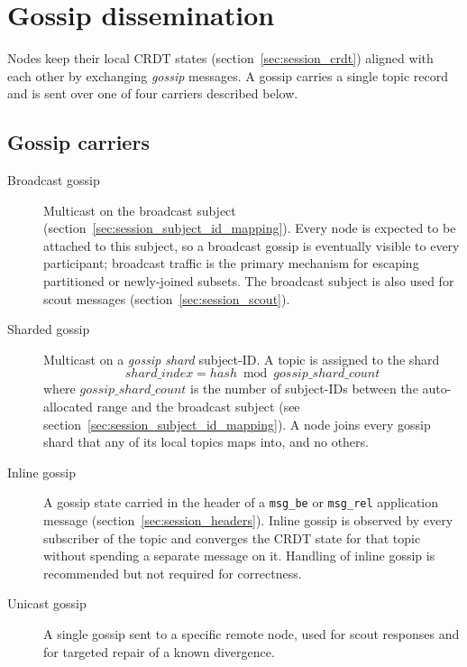 \section{Gossip dissemination}\label{sec:session_gossip}

Nodes keep their local CRDT states (section~\ref{sec:session_crdt}) aligned with
each other by exchanging \emph{gossip} messages.
A gossip carries a single topic record and is sent over one of four carriers
described below.

\subsection{Gossip carriers}

\begin{description}
    \item[Broadcast gossip] Multicast on the broadcast subject
    (section~\ref{sec:session_subject_id_mapping}). Every node is expected to be
    attached to this subject, so a broadcast gossip is eventually visible to every
    participant; broadcast traffic is the primary mechanism for escaping
    partitioned or newly-joined subsets. The broadcast subject is also used for
    scout messages (section~\ref{sec:session_scout}).

    \item[Sharded gossip] Multicast on a \emph{gossip shard} subject-ID.
    A topic is assigned to the shard
    \[
        \mathit{shard\_index} = \mathit{hash} \bmod \mathit{gossip\_shard\_count}
    \]
    where $\mathit{gossip\_shard\_count}$ is the number of subject-IDs between
    the auto-allocated range and the broadcast subject (see
    section~\ref{sec:session_subject_id_mapping}). A node joins every gossip shard
    that any of its local topics maps into, and no others.

    \item[Inline gossip] A gossip state carried in the header of a
    \texttt{msg\_be} or \texttt{msg\_rel} application message
    (section~\ref{sec:session_headers}). Inline gossip is observed by every
    subscriber of the topic and converges the CRDT state for that topic without
    spending a separate message on it. Handling of inline gossip is recommended
    but not required for correctness.

    \item[Unicast gossip] A single gossip sent to a specific remote node,
    used for scout responses and for targeted repair of a known divergence.
\end{description}

